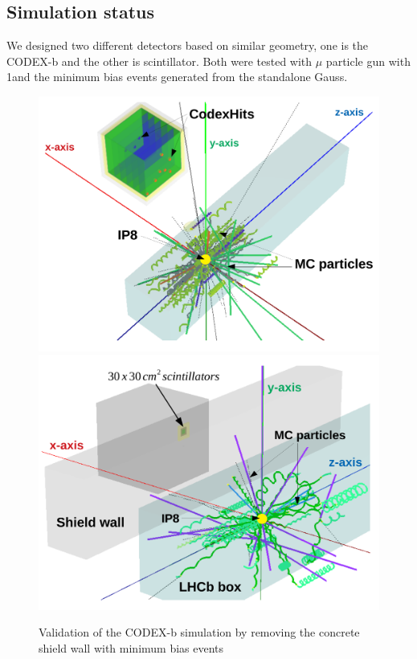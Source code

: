 \subsection{Simulation status}

We designed two different detectors based on similar geometry, one is the CODEX-b and the other is scintillator.
Both were tested with $\mu$ particle gun with 1\tev and the minimum bias events generated from the standalone Gauss. 

\begin{figure}[h]
\centering
    \includegraphics[width=12cm]{figs/INT/Minbias.pdf} \\
    \vspace{0.25cm} 
    \includegraphics[width=12cm]{figs/INT/Scint.pdf}
\caption{
    Validation of the CODEX-b simulation by removing the concrete shield wall with minimum bias events 
}
\end{figure}

